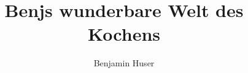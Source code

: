 \title{Benjs wunderbare Welt des Kochens}
\author{Benjamin Huser}
\maketitle


\newpage
\renewcommand*\contentsname{Inhalt}
\tableofcontents

\vspace{9em}
